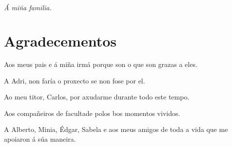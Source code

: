 
\chapter*{ }

\begin{flushright}
\emph{Á miña familia.}
\end{flushright}


\chapter*{Agradecementos}
Aos meus pais e á miña irmá porque son o que son grazas a eles.

A Adri, non faría o proxecto se non fose por el.

Ao meu titor, Carlos, por axudarme durante todo este tempo.

Aos compañeiros de facultade polos bos momentos vividos.

A Alberto, Minia, Édgar, Sabela e aos meus amigos de toda a vida que me apoiaron á súa maneira.
